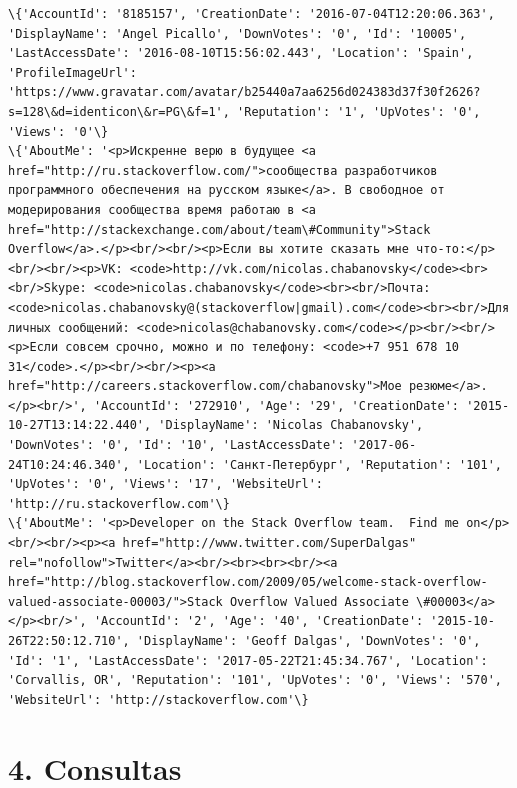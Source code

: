 \documentclass[11pt]{article}
\begin{document}
    \begin{Verbatim}[commandchars=\\\{\}]
\{'AccountId': '8185157', 'CreationDate': '2016-07-04T12:20:06.363', 'DisplayName': 'Angel Picallo', 'DownVotes': '0', 'Id': '10005', 'LastAccessDate': '2016-08-10T15:56:02.443', 'Location': 'Spain', 'ProfileImageUrl': 'https://www.gravatar.com/avatar/b25440a7aa6256d024383d37f30f2626?s=128\&d=identicon\&r=PG\&f=1', 'Reputation': '1', 'UpVotes': '0', 'Views': '0'\}
\{'AboutMe': '<p>Искренне верю в будущее <a href="http://ru.stackoverflow.com/">сообщества разработчиков программного обеспечения на русском языке</a>. В свободное от модерирования сообщества время работаю в <a href="http://stackexchange.com/about/team\#Community">Stack Overflow</a>.</p><br/><br/><p>Если вы хотите сказать мне что-то:</p><br/><br/><p>VK: <code>http://vk.com/nicolas.chabanovsky</code><br><br/>Skype: <code>nicolas.chabanovsky</code><br><br/>Почта: <code>nicolas.chabanovsky@(stackoverflow|gmail).com</code><br><br/>Для личных сообщений: <code>nicolas@chabanovsky.com</code></p><br/><br/><p>Если совсем срочно, можно и по телефону: <code>+7 951 678 10 31</code>.</p><br/><br/><p><a href="http://careers.stackoverflow.com/chabanovsky">Мое резюме</a>.</p><br/>', 'AccountId': '272910', 'Age': '29', 'CreationDate': '2015-10-27T13:14:22.440', 'DisplayName': 'Nicolas Chabanovsky', 'DownVotes': '0', 'Id': '10', 'LastAccessDate': '2017-06-24T10:24:46.340', 'Location': 'Санкт-Петербург', 'Reputation': '101', 'UpVotes': '0', 'Views': '17', 'WebsiteUrl': 'http://ru.stackoverflow.com'\}
\{'AboutMe': '<p>Developer on the Stack Overflow team.  Find me on</p><br/><br/><p><a href="http://www.twitter.com/SuperDalgas" rel="nofollow">Twitter</a><br/><br><br><br/><a href="http://blog.stackoverflow.com/2009/05/welcome-stack-overflow-valued-associate-00003/">Stack Overflow Valued Associate \#00003</a></p><br/>', 'AccountId': '2', 'Age': '40', 'CreationDate': '2015-10-26T22:50:12.710', 'DisplayName': 'Geoff Dalgas', 'DownVotes': '0', 'Id': '1', 'LastAccessDate': '2017-05-22T21:45:34.767', 'Location': 'Corvallis, OR', 'Reputation': '101', 'UpVotes': '0', 'Views': '570', 'WebsiteUrl': 'http://stackoverflow.com'\}

    \end{Verbatim}

    \hypertarget{consultas}{%
\section{4. Consultas}\label{consultas}}
\end{document}
